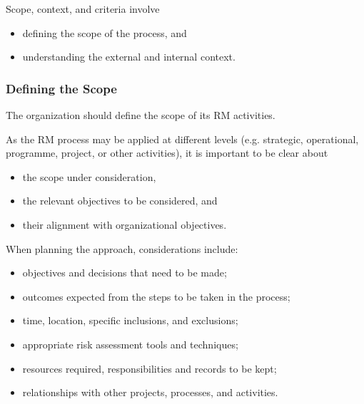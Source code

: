 \documentclass[letterpaper,10pt,english]{jupyterBook}
\begin{document}
\sphinxAtStartPar
Scope, context, and criteria involve
\begin{itemize}
\item {} 
\sphinxAtStartPar
defining the scope of the process, and

\item {} 
\sphinxAtStartPar
understanding the external and internal context.

\end{itemize}


\subsubsection{Defining the Scope}
\label{\detokenize{PM/rm:defining-the-scope}}
\sphinxAtStartPar
The organization should define the scope of its RM activities.

\sphinxAtStartPar
As the RM process may be applied at different levels (e.g. strategic, operational, programme, project, or other activities), it is important to be clear about
\begin{itemize}
\item {} 
\sphinxAtStartPar
the scope under consideration,

\item {} 
\sphinxAtStartPar
the relevant objectives to be considered, and

\item {} 
\sphinxAtStartPar
their alignment with organizational objectives.

\end{itemize}

\sphinxAtStartPar
When planning the approach, considerations include:
\begin{itemize}
\item {} 
\sphinxAtStartPar
objectives and decisions that need to be made;

\item {} 
\sphinxAtStartPar
outcomes expected from the steps to be taken in the process;

\item {} 
\sphinxAtStartPar
time, location, specific inclusions, and exclusions;

\item {} 
\sphinxAtStartPar
appropriate risk assessment tools and techniques;

\item {} 
\sphinxAtStartPar
resources required, responsibilities and records to be kept;

\item {} 
\sphinxAtStartPar
relationships with other projects, processes, and activities.

\end{itemize}
\end{document}
